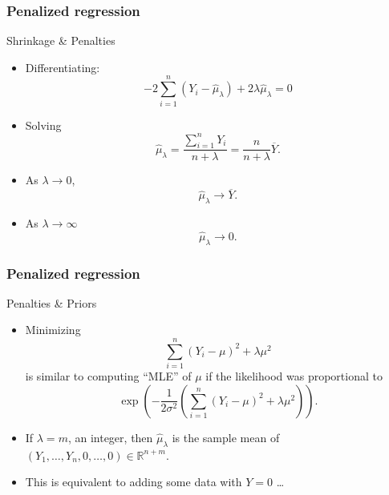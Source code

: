 \documentclass[handout]{beamer}
\newcommand{\Ybar}{\overline{Y}}
\begin{document}

   \begin{frame} \frametitle{Penalized regression}

   \begin{block}
     {Shrinkage \& Penalties}
     \begin{itemize}
   \item Differentiating:
   $$- 2 \sum_{i=1}^n (Y_i - \widehat{\mu}_{\lambda}) + 2 \lambda \widehat{\mu}_{\lambda} = 0$$

   \item Solving
   $$
   \widehat{\mu}_{\lambda} = \frac{\sum_{i=1}^n Y_i}{n + \lambda} = \frac{n}{n+\lambda} \overline{Y}.$$
     \item As
   $\lambda \rightarrow 0$,
   $$
   \widehat{\mu}_{\lambda} \rightarrow \Ybar.$$

   \item As $\lambda \rightarrow \infty$
   $$
   \widehat{\mu}_{\lambda} \rightarrow 0.$$

     \end{itemize}

   \end{block}
   \end{frame}


   \begin{frame} \frametitle{Penalized regression}

   \begin{block}
     {Penalties \& Priors}
     \begin{itemize}
     \item Minimizing
   $$
   \sum_{i=1}^n (Y_i - \mu)^2 + \lambda \mu^2$$
   is similar to computing ``MLE'' of $\mu$ if the likelihood
   was proportional to
   $$
   \exp \left(-\frac{1}{2\sigma^2}\left( \sum_{i=1}^n (Y_i - \mu)^2 + \lambda \mu^2\right) \right).
   $$


   \item If $\lambda=m$, an integer, then $\widehat{\mu}_{\lambda}$ is the sample
   mean of $(Y_1, \dots, Y_n,0 ,\dots, 0) \in \mathbb{R}^{n+m}$.
   \item This is equivalent to adding some data with $Y=0$ \dots

     \end{itemize}

   \end{block}
   \end{frame}
\end{document}
